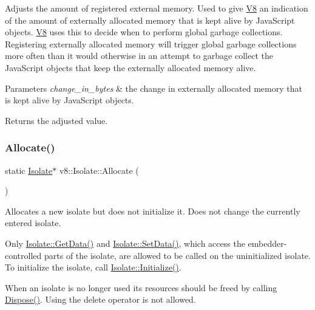 Adjusts the amount of registered external memory. Used to give \mbox{\hyperlink{classv8_1_1V8}{V8}} an indication of the amount of externally allocated memory that is kept alive by Java\+Script objects. \mbox{\hyperlink{classv8_1_1V8}{V8}} uses this to decide when to perform global garbage collections. Registering externally allocated memory will trigger global garbage collections more often than it would otherwise in an attempt to garbage collect the Java\+Script objects that keep the externally allocated memory alive.


\begin{DoxyParams}{Parameters}
{\em change\+\_\+in\+\_\+bytes} & the change in externally allocated memory that is kept alive by Java\+Script objects. \\
\hline
\end{DoxyParams}
\begin{DoxyReturn}{Returns}
the adjusted value. 
\end{DoxyReturn}
\mbox{\label{classv8_1_1Isolate_a6c0fccd7594c848dc388fd538106b6c7}} 
\subsubsection{\texorpdfstring{Allocate()}{Allocate()}}
{\footnotesize\ttfamily static \mbox{\hyperlink{classv8_1_1Isolate}{Isolate}}$\ast$ v8\+::\+Isolate\+::\+Allocate (\begin{DoxyParamCaption}{ }\end{DoxyParamCaption})\hspace{0.3cm}{\ttfamily [static]}}

Allocates a new isolate but does not initialize it. Does not change the currently entered isolate.

Only \mbox{\hyperlink{classv8_1_1Isolate_aed85b3c82bf69a60ecebc2558ab95083}{Isolate\+::\+Get\+Data()}} and \mbox{\hyperlink{classv8_1_1Isolate_a2ae968a7ff8a397f1ac09d32990883f6}{Isolate\+::\+Set\+Data()}}, which access the embedder-\/controlled parts of the isolate, are allowed to be called on the uninitialized isolate. To initialize the isolate, call \mbox{\hyperlink{classv8_1_1Isolate_a508901d16ef77659eb9e2b3dd476db07}{Isolate\+::\+Initialize()}}.

When an isolate is no longer used its resources should be freed by calling \mbox{\hyperlink{classv8_1_1Isolate_a1a5a5762e4221aff8c6b10f9e3cec0af}{Dispose()}}. Using the delete operator is not allowed.

